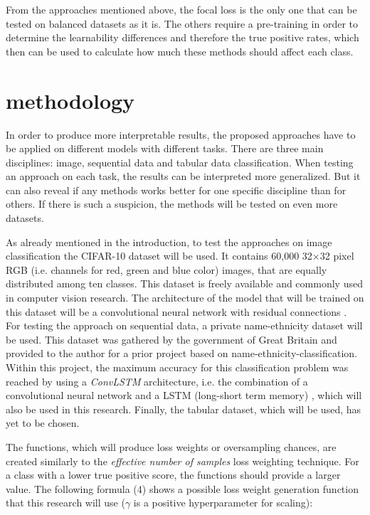 \documentclass[journal]{IEEEtran}
\begin{document}
From the approaches mentioned above, the focal loss is the only one that can be tested on balanced datasets as it is. 
The others require a pre-training in order to determine the learnability differences and therefore the true positive rates, which then can be used to calculate how much these methods should affect each class.

\section{methodology}
In order to produce more interpretable results, the proposed approaches have to be applied on different models with different tasks. 
There are three main disciplines: image, sequential data and tabular data classification. 
When testing an approach on each task, the results can be interpreted more generalized. 
But it can also reveal if any methods works better for one specific discipline than for others. 
If there is such a suspicion, the methods will be tested on even more datasets.

As already mentioned in the introduction, to test the approaches on image classification the CIFAR-10 dataset will be used.
It contains 60,000 32$\times$32 pixel RGB (i.e. channels for red, green and blue color) images, that are equally distributed among ten classes.
This dataset is freely available and commonly used in computer vision research.
The architecture of the model that will be trained on this dataset will be a convolutional neural network \cite{lecun1989backpropagation} with residual connections \cite{he2016deep}.
For testing the approach on sequential data, a private name-ethnicity dataset will be used.
This dataset was gathered by the government of Great Britain and provided to the author for a prior project based on name-ethnicity-classification.
Within this project, the maximum accuracy for this classification problem was reached by using a \emph{ConvLSTM} architecture, i.e. the combination of a convolutional neural network and a LSTM (long-short term memory) \cite{gers2000learning}, which will also be used in this research. 
Finally, the tabular dataset, which will be used, has yet to be chosen.

The functions, which will produce loss weights or oversampling chances, are created similarly to the \emph{effective number of samples} loss weighting technique. 
For a class with a lower true positive score, the functions should provide a larger value. 
The following formula (4) shows a possible loss weight generation function that this research will use ($\gamma$ is a positive hyperparameter for scaling):
\end{document}
